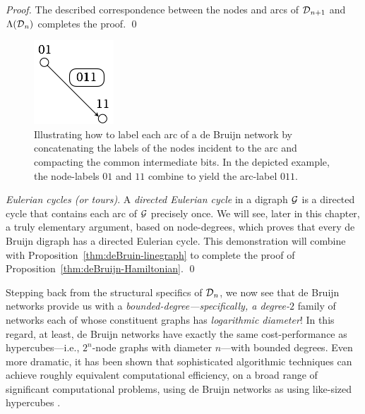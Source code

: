 {\begin{proof}
The described correspondence between the nodes and arcs of $\mbox{$\cal D$}_{n+1}$
and $\Lambda(\mbox{$\cal D$}_n)$ completes the proof.  \qed
\end{proof}

\begin{figure}[hbt]
\begin{center}
       \includegraphics[scale=0.6]{FiguresGraph/dBlabelEdge}
\caption{Illustrating how to label each arc of a de Bruijn network by
  concatenating the labels of the nodes incident to the arc and
  compacting the common intermediate bits.  In the depicted example,
  the node-labels $01$ and $11$ combine to yield the arc-label $011$.}
  \label{fig:dBlabelEdge}
\end{center}
\end{figure}

\medskip

{\it Eulerian cycles (or tours)}. 
 A {\it directed Eulerian cycle} in a digraph
$\mbox{$\cal G$}$ is a directed cycle that contains each arc of $\mbox{$\cal G$}$ precisely
once.  We will see, later in this chapter, a truly elementary
argument, based on node-degrees, which proves that every de Bruijn
digraph has a directed Eulerian cycle.  This demonstration will
combine with Proposition~\ref{thm:deBruin-linegraph} to complete the
proof of Proposition~\ref{thm:deBruijn-Hamiltonian}.  \qed
}

\bigskip

Stepping back from the structural specifics of $\mbox{$\cal D$}_n$, we now see that
de Bruijn networks provide us with a {\em
  bounded-degree---specifically, a degree-$2$} family of networks each
of whose constituent graphs has {\em logarithmic diameter}!  In this
regard, at least, de Bruijn networks have exactly the same
cost-performance as hypercubes---i.e., $2^n$-node graphs with diameter
$n$---with bounded degrees.  Even more dramatic, it has been shown
that sophisticated algorithmic techniques can achieve roughly
equivalent computational efficiency, on a broad range of significant
computational problems, using de Bruijn networks as using like-sized
hypercubes \cite{AnnexsteinBR90, BermondP89, Ullman84}.



